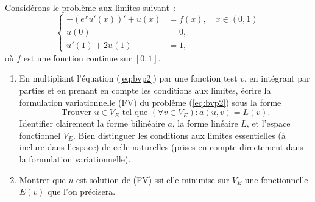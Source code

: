 \documentclass[12pt,a4paper]{article}
\begin{document}
 \\ 
Considérons le problème aux limites suivant~:
\begin{equation}\label{eq:bvp2}
\left\{\begin{array}{rl}
-(e^x u'(x))' + u(x) &= f(x), \quad x\in (0,1)\\
 u(0) &= 0 ,\\
 u'(1) + 2 u(1) &= 1,
 \end{array}\right.
 \end{equation}
où $f$ est une fonction continue sur $[0,1]$.%
\begin{enumerate}
\item En multipliant l'équation (\ref{eq:bvp2}) par une fonction test $v$, en int\'egrant par parties et en prenant en compte les conditions aux limites, écrire la formulation variationnelle (FV) du problème (\ref{eq:bvp2}) sous la forme
$$
\mbox{Trouver } u\in V_E \mbox{ tel que } (\forall v \in V_E): a(u,v) = L(v).
$$
Identifier clairement la forme bilinéaire $a$, la forme linéaire $L$, et l'espace fonctionnel $V_E$.  Bien distinguer les conditions aux limites essentielles (à inclure dans l'espace) de celle naturelles (prises en compte directement dans la formulation variationnelle).
\item Montrer que $u$ est solution de (FV) ssi elle minimise sur $V_E$ une fonctionnelle $E(v)$ que l'on pr\'ecisera.
\end{enumerate}
\end{document}
